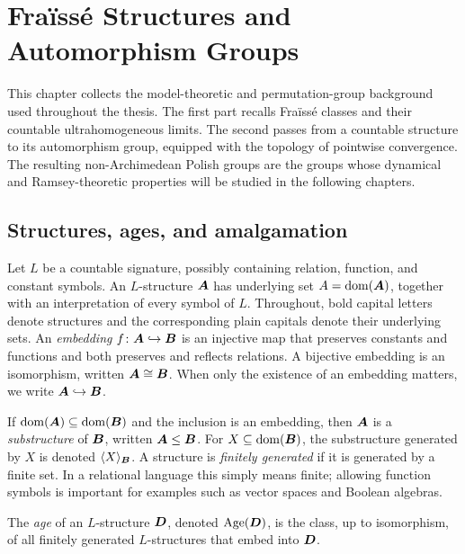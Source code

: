\chapter{Fraïssé Structures and Automorphism Groups}
\label{chap:fraisse-automorphism-groups}

This chapter collects the model-theoretic and permutation-group background used
throughout the thesis.  The first part recalls Fraïssé classes and their
countable ultrahomogeneous limits.  The second passes from a countable structure
to its automorphism group, equipped with the topology of pointwise convergence.
The resulting non-Archimedean Polish groups are the groups whose dynamical and
Ramsey-theoretic properties will be studied in the following chapters.

\section{Structures, ages, and amalgamation}

Let \(L\) be a countable signature, possibly containing relation, function, and
constant symbols.  An \(L\)-structure \(\boldsymbol{A}\) has underlying set
\(A=\operatorname{dom}(\boldsymbol{A})\), together with an interpretation of every symbol of \(L\).
Throughout, bold capital letters denote structures and the corresponding plain
capitals denote their underlying sets.  An
\emph{embedding} \(f\colon \boldsymbol{A}\hookrightarrow \boldsymbol{B}\) is an injective map that
preserves constants and functions and both preserves and reflects relations.
A bijective embedding is an isomorphism, written \(\boldsymbol{A}\cong \boldsymbol{B}\). When only the
existence of an embedding matters, we write \(\boldsymbol{A}\hookrightarrow \boldsymbol{B}\).

If \(\operatorname{dom}(\boldsymbol{A})\subseteq\operatorname{dom}(\boldsymbol{B})\) and the inclusion is an embedding, then \(\boldsymbol{A}\)
is a \emph{substructure} of \(\boldsymbol{B}\), written \(\boldsymbol{A}\leq \boldsymbol{B}\).  For
\(X\subseteq\operatorname{dom}(\boldsymbol{B})\), the substructure generated by \(X\) is denoted
\(\langle X\rangle_{\boldsymbol{B}}\).  A structure is \emph{finitely generated} if it is
generated by a finite set.  In a relational language this simply means finite;
allowing function symbols is important for examples such as vector spaces and
Boolean algebras.

\begin{definition}[Age]
    The \emph{age} of an \(L\)-structure \(\boldsymbol{D}\), denoted \(\operatorname{Age}(\boldsymbol{D})\), is the
    class, up to isomorphism, of all finitely generated \(L\)-structures that
    embed into \(\boldsymbol{D}\).
\end{definition}

